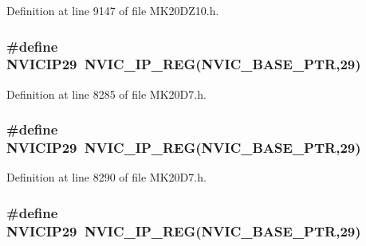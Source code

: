 Definition at line 9147 of file M\+K20\+D\+Z10.\+h.

\subsubsection[{\texorpdfstring{N\+V\+I\+C\+I\+P29}{NVICIP29}}]{\setlength{\rightskip}{0pt plus 5cm}\#define N\+V\+I\+C\+I\+P29~{\bf N\+V\+I\+C\+\_\+\+I\+P\+\_\+\+R\+EG}({\bf N\+V\+I\+C\+\_\+\+B\+A\+S\+E\+\_\+\+P\+TR},29)}\hypertarget{group___n_v_i_c___register___accessor___macros_ga26a6b531110015958d129422f753ee2b}{}\label{group___n_v_i_c___register___accessor___macros_ga26a6b531110015958d129422f753ee2b}


Definition at line 8285 of file M\+K20\+D7.\+h.

\subsubsection[{\texorpdfstring{N\+V\+I\+C\+I\+P29}{NVICIP29}}]{\setlength{\rightskip}{0pt plus 5cm}\#define N\+V\+I\+C\+I\+P29~{\bf N\+V\+I\+C\+\_\+\+I\+P\+\_\+\+R\+EG}({\bf N\+V\+I\+C\+\_\+\+B\+A\+S\+E\+\_\+\+P\+TR},29)}\hypertarget{group___n_v_i_c___register___accessor___macros_ga26a6b531110015958d129422f753ee2b}{}\label{group___n_v_i_c___register___accessor___macros_ga26a6b531110015958d129422f753ee2b}


Definition at line 8290 of file M\+K20\+D7.\+h.

\subsubsection[{\texorpdfstring{N\+V\+I\+C\+I\+P29}{NVICIP29}}]{\setlength{\rightskip}{0pt plus 5cm}\#define N\+V\+I\+C\+I\+P29~{\bf N\+V\+I\+C\+\_\+\+I\+P\+\_\+\+R\+EG}({\bf N\+V\+I\+C\+\_\+\+B\+A\+S\+E\+\_\+\+P\+TR},29)}\hypertarget{group___n_v_i_c___register___accessor___macros_ga26a6b531110015958d129422f753ee2b}{}\label{group___n_v_i_c___register___accessor___macros_ga26a6b531110015958d129422f753ee2b}


